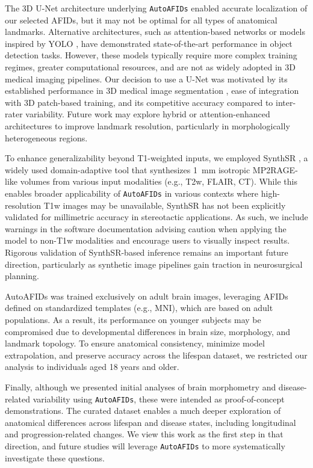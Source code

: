 The 3D U-Net architecture underlying \texttt{AutoAFIDs} enabled accurate localization of our selected AFIDs, but it may not be optimal for all types of anatomical landmarks. Alternative architectures, such as attention-based networks or models inspired by YOLO \cite{Redmon2015-ia}, have demonstrated state-of-the-art performance in object detection tasks. However, these models typically require more complex training regimes, greater computational resources, and are not as widely adopted in 3D medical imaging pipelines. Our decision to use a U-Net was motivated by its established performance in 3D medical image segmentation \cite{Cicek2016-dz}, ease of integration with 3D patch-based training, and its competitive accuracy compared to inter-rater variability. Future work may explore hybrid or attention-enhanced architectures to improve landmark resolution, particularly in morphologically heterogeneous regions.

To enhance generalizability beyond T1-weighted inputs, we employed SynthSR \cite{Iglesias2023-co}, a widely used domain-adaptive tool that synthesizes 1~mm isotropic MP2RAGE-like volumes from various input modalities (e.g., T2w, FLAIR, CT). While this enables broader applicability of \texttt{AutoAFIDs} in various contexts where high-resolution T1w images may be unavailable, SynthSR has not been explicitly validated for millimetric accuracy in stereotactic applications. As such, we include warnings in the software documentation advising caution when applying the model to non-T1w modalities and encourage users to visually inspect results. Rigorous validation of SynthSR-based inference remains an important future direction, particularly as synthetic image pipelines gain traction in neurosurgical planning.

AutoAFIDs was trained exclusively on adult brain images, leveraging AFIDs defined on standardized templates (e.g., MNI), which are based on adult populations. As a result, its performance on younger subjects may be compromised due to developmental differences in brain size, morphology, and landmark topology. To ensure anatomical consistency, minimize model extrapolation, and preserve accuracy across the lifespan dataset, we restricted our analysis to individuals aged 18 years and older.

Finally, although we presented initial analyses of brain morphometry and disease-related variability using \texttt{AutoAFIDs}, these were intended as proof-of-concept demonstrations. The curated dataset enables a much deeper exploration of anatomical differences across lifespan and disease states, including longitudinal and progression-related changes. We view this work as the first step in that direction, and future studies will leverage \texttt{AutoAFIDs} to more systematically investigate these questions.

